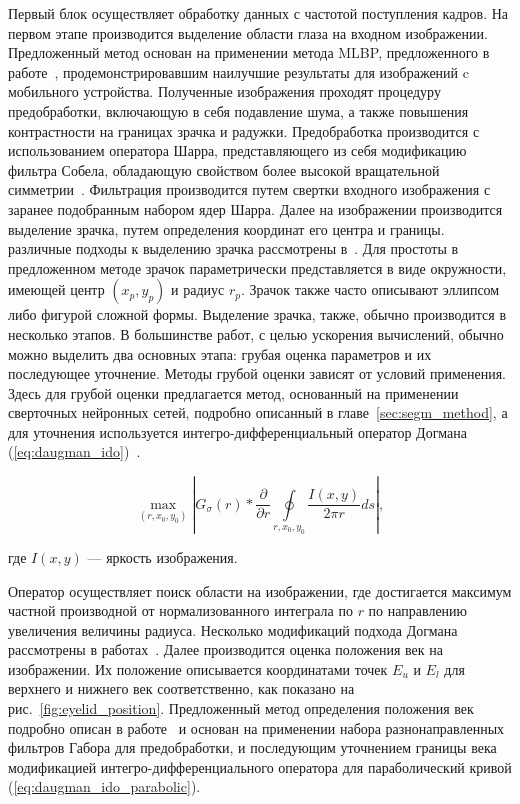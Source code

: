 Первый блок осуществляет обработку данных с частотой поступления кадров. На первом этапе производится выделение области глаза на входном изображении. Предложенный метод основан на применении метода MLBP, предложенного в работе~\cite{kaushik_lbp_2014}, продемонстрировавшим наилучшие результаты для изображений c мобильного устройства. Полученные изображения проходят процедуру предобработки, включающую в себя подавление шума, а также повышения контрастности на границах зрачка и радужки. Предобработка производится с использованием оператора Шарра, представляющего из себя модификацию фильтра Собела, обладающую свойством более высокой вращательной симметрии~\cite{scharr_2007}. Фильтрация производится путем свертки входного изображения с заранее подобранным набором ядер Шарра. Далее на изображении производится выделение зрачка, путем определения координат его центра и границы. различные подходы к выделению зрачка рассмотрены в~\cite{matveev_doctor_thesis}. Для простоты в предложенном методе зрачок параметрически представляется в виде окружности, имеющей центр $(x_p,y_p)$ и радиус $r_p$. Зрачок также часто описывают эллипсом либо фигурой сложной формы. Выделение зрачка, также, обычно производится в несколько этапов. В большинстве работ, с целью ускорения вычислений, обычно можно выделить два основных этапа: грубая оценка параметров и их последующее уточнение. Методы грубой оценки зависят от условий применения. Здесь для грубой оценки предлагается метод, основанный на применении сверточных нейронных сетей, подробно описанный в главе~\ref{sec:segm_method}, а для уточнения используется интегро-дифференциальный оператор Догмана (\ref{eq:daugman_ido})~\cite{daugman_how_works}.

\begin{equation}\label{eq:daugman_ido}
\max \limits_{(r,x_0,y_0)} \left | G_\sigma (r) * 
{\frac{\partial}{\partial r} \oint \limits_{r, x_0, y_0} 
	{\frac{I(x,y)}{2 \pi r} ds}} \right |,
\end{equation}

\noindent
где $I(x, y)$ — яркость изображения.

\noindent
Оператор осуществляет поиск области на изображении, где достигается максимум частной производной от нормализованного интеграла по $r$ по направлению увеличения величины радиуса. Несколько модификаций подхода Догмана рассмотрены в работах~\cite{alonso_12,hu_11,jeong_10,mahadeo_12}. Далее производится оценка положения век на изображении. Их положение описывается координатами точек $E_u$ и $E_l$ для верхнего и нижнего век соответственно, как показано на рис.~\ref{fig:eyelid_position}. Предложенный метод определения положения век подробно описан в работе~\cite{odinokikh_eyelids_2016} и основан на применении набора разнонаправленных фильтров Габора для предобработки, и последующим уточнением границы века модификацией интегро-дифференциального оператора для параболический кривой (\ref{eq:daugman_ido_parabolic}).

